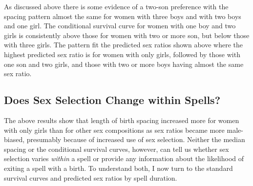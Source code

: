 \documentclass[12pt,letterpaper]{article}
\begin{document}
As discussed above there is some evidence of a two-son preference with
the spacing pattern almost the same for women with three boys and with
two boys and one girl.
The conditional survival curve for women with one boy and two girls is
consistently above those for women with two or more son, but below those 
with three girls.
The pattern fit the predicted sex ratios shown above where the highest
predicted sex ratio is for women with only girls, followed by those
with one son and two girls, and those with two or more boys having
almost the same sex ratio.



\subsection{Does Sex Selection Change within Spells?}

The above results show that length of birth spacing increased 
more for women with only girls than for other sex compositions
as sex ratios became more male-biased, presumably because
of increased use of sex selection.
Neither the median spacing or the conditional survival curves,
however, can tell us whether sex selection varies \emph{within}
a spell or provide any information about the likelihood of
exiting a spell with a birth.
To understand both, I now turn to the standard survival curves
and predicted sex ratios by spell duration.
\end{document}
